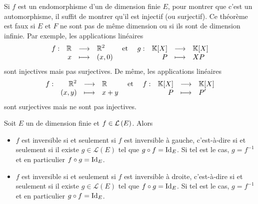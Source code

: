 \documentclass{magnolia}
\begin{document}
\begin{remarques}
\remarque[utile=-3] Si $f$ est un endomorphisme d'un \Kev de dimension
  finie $E$, pour montrer que c'est un automorphisme, il suffit de montrer
  qu'il est injectif (ou surjectif).
\remarque[utile=-1] Ce théorème est faux si $E$ et $F$ ne sont pas de même dimension
  ou si ils sont de dimension infinie. Par exemple, les applications linéaires
  \[\dspappli{f}{\R}{\R^2}{x}{\p{x,0}} \et
    \dspappli{g}{\polyK}{\polyK}{P}{XP}\]
  sont injectives mais pas surjectives. De même, les applications linéaires
  \[\dspappli{f}{\R^2}{\R}{\p{x,y}}{x+y} \et
    \dspappli{f}{\polyK}{\polyK}{P}{P'}\]
  sont surjectives mais ne sont pas injectives.
\end{remarques}

\begin{proposition}
Soit $E$ un \Kev de dimension finie et $f\in\mathcal{L}\left(E\right)$. Alors
\begin{itemize}
\item $f$ est inversible si et seulement si $f$ est inversible à gauche, c'est-à-dire
  si et seulement si il existe $g\in\mathcal{L}(E)$ tel que $g\circ f=\operatorname{Id}_E$. Si tel
  est le cas, $g=f^{-1}$ et en particulier $f\circ g=\operatorname{Id}_E$.
\item $f$ est inversible si et seulement si $f$ est inversible à droite, c'est-à-dire
  si et seulement si il existe $g\in\mathcal{L}(E)$ tel que $f\circ g=\operatorname{Id}_E$. Si tel
  est le cas, $g=f^{-1}$ et en particulier $g\circ f=\operatorname{Id}_E$.
\end{itemize}
\end{proposition}
\end{document}
